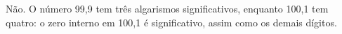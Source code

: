 Não. O número 99{,}9 tem três algarismos significativos, enquanto 100{,}1 tem quatro: o zero interno em 100{,}1 é significativo, assim como os demais dígitos. 